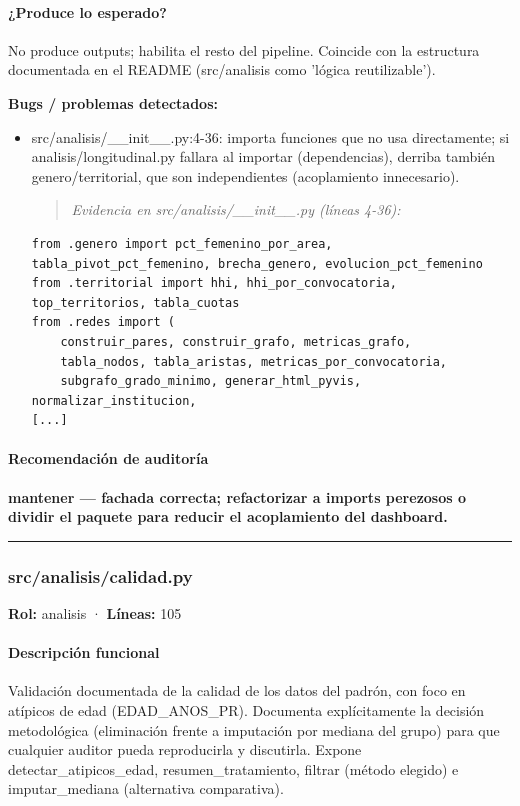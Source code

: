 \paragraph{¿Produce lo esperado?}
No produce outputs; habilita el resto del pipeline. Coincide con la estructura documentada en el README (src/analisis como 'lógica reutilizable').

\begin{tcolorbox}[riesgo]
\textbf{Bugs / problemas detectados:}
\begin{itemize}
  \item src/analisis/\_\_init\_\_.py:4-36: importa funciones que no usa directamente; si analisis/longitudinal.py fallara al importar (dependencias), derriba también genero/territorial, que son independientes (acoplamiento innecesario).
\begin{quote}\footnotesize\ttfamily
\noindent\emph{Evidencia en src/analisis/\_\_init\_\_.py (líneas 4-36):}
\end{quote}
\begin{lstlisting}
from .genero import pct_femenino_por_area, tabla_pivot_pct_femenino, brecha_genero, evolucion_pct_femenino
from .territorial import hhi, hhi_por_convocatoria, top_territorios, tabla_cuotas
from .redes import (
    construir_pares, construir_grafo, metricas_grafo,
    tabla_nodos, tabla_aristas, metricas_por_convocatoria,
    subgrafo_grado_minimo, generar_html_pyvis, normalizar_institucion,
[...]
\end{lstlisting}

\end{itemize}
\end{tcolorbox}

\paragraph{Recomendación de auditoría}
\textbf{mantener --- fachada correcta; refactorizar a imports perezosos o dividir el paquete para reducir el acoplamiento del dashboard.}

\medskip
\hrule

\subsubsection{src/analisis/calidad.py}
\textbf{Rol:} analisis · \textbf{Líneas:} 105

\paragraph{Descripción funcional}
Validación documentada de la calidad de los datos del padrón, con foco en atípicos de edad (EDAD\_ANOS\_PR). Documenta explícitamente la decisión metodológica (eliminación frente a imputación por mediana del grupo) para que cualquier auditor pueda reproducirla y discutirla. Expone detectar\_atipicos\_edad, resumen\_tratamiento, filtrar (método elegido) e imputar\_mediana (alternativa comparativa).

